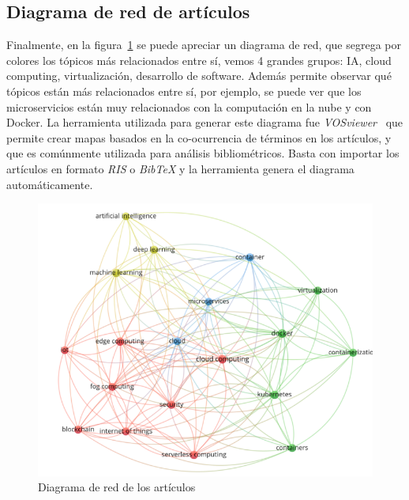 \subsection{Diagrama de red de artículos}
Finalmente, en la figura~\ref{fig:diagrama-red-articulos} se puede apreciar un diagrama de red, que segrega por colores los tópicos más relacionados entre sí, vemos 4 grandes grupos: IA, cloud computing, virtualización, desarrollo de software. Además permite observar qué tópicos están más relacionados entre sí, por ejemplo, se puede ver que los microservicios están muy relacionados con la computación en la nube y con Docker. La herramienta utilizada para generar este diagrama fue \textit{VOSviewer}~\citep{vosviewer_website} que permite crear mapas basados en la co-ocurrencia de términos en los artículos, y que es comúnmente utilizada para análisis bibliométricos. Basta con importar los artículos en formato \textit{RIS} o \textit{BibTeX} y la herramienta genera el diagrama automáticamente.
\begin{figure}[H]
    \centering
    \includegraphics[scale=0.8]{tablas-images/cp2/diagrama-red-busqueda.png}
    \caption{Diagrama de red de los artículos}\label{fig:diagrama-red-articulos}
\end{figure}